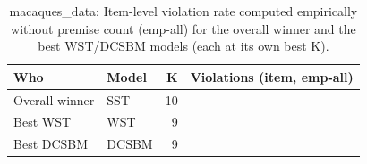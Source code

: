 \begin{table}[!h]
\centering
\caption{macaques_data: Item-level violation rate computed empirically without premise count (emp-all) for the overall winner and the best WST/DCSBM models (each at its own best K).\\\label{tab:app-macaques_data-best-item-empall}}
\centering
\begin{tabular}[t]{llrr}
\toprule
Who & Model & K & Violations (item, emp-all)\\
\midrule
Overall winner & SST & 10 & \\
Best WST & WST & 9 & \\
Best DCSBM & DCSBM & 9 & \\
\bottomrule
\end{tabular}
\end{table}
